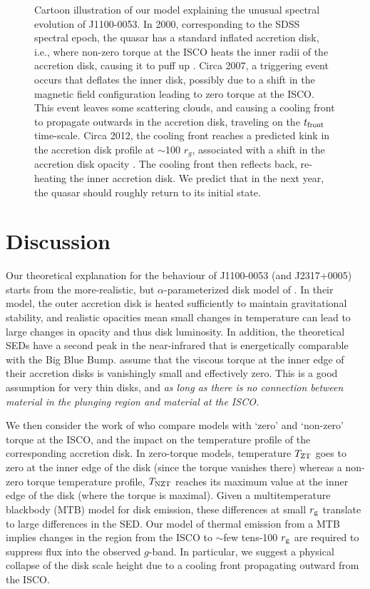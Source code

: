 \documentclass{nature}
\begin{document}
\begin{figure}
{    Cartoon illustration of our model explaining the unusual spectral evolution of J1100-0053. In 2000, corresponding to the SDSS spectral epoch, the quasar has a standard inflated accretion disk, i.e., where non-zero torque at the ISCO heats the inner radii of the accretion disk, causing it to puff up \citep[e.g.,][]{Zimmerman2005}. Circa 2007, a triggering event occurs that deflates the inner disk, possibly due to a shift in the magnetic field configuration leading to zero torque at the ISCO.  This event leaves some scattering clouds, and causing a cooling front to propagate outwards in the accretion disk, traveling on the $t_{\rm front}$ time-scale. Circa 2012, the cooling front reaches a predicted kink in the accretion disk profile at $\sim$100 $r_{g}$, associated with a shift in the accretion disk opacity \citep[e.g., Figure 2 of ][]{Sirko_Goodman2003}.  The cooling front then reflects back, re-heating the inner accretion disk. We predict that in the next year, the quasar should roughly return to its initial state.}
  \label{fig:J110057_diskmodel}
\end{figure}

\section{Discussion} 
Our theoretical explanation for the behaviour of J1100-0053 (and
J2317+0005) starts from the more-realistic, but $\alpha$-parameterized
disk model of \cite{Sirko_Goodman2003}. In their model, 
the outer accretion disk is heated sufficiently to
maintain gravitational stability, and realistic opacities mean small
changes in temperature can lead to large changes in opacity and thus disk luminosity. 
In addition, the theoretical SEDs have a second peak
in the near-infrared that is energetically comparable with the Big
Blue Bump. 
\cite{Sirko_Goodman2003} assume
that the viscous torque at the inner edge of their accretion
disks is vanishingly small and effectively zero. This is a good
assumption for very thin disks, and
\emph{as long as there is no connection between material in the plunging
region and material at the ISCO.}

We then consider the work of
\cite{Zimmerman2005} who compare models with `zero' and `non-zero'
torque at the ISCO,
and the impact on the temperature profile of the corresponding accretion disk.
In zero-torque models, temperature $T_{\rm ZT}$ goes to zero at
the inner edge of the disk (since the torque vanishes there) whereas
a non-zero torque temperature profile, $T_{\rm NZT}$ reaches its
maximum value at the inner edge of the disk (where the torque is maximal).
Given a multitemperature blackbody (MTB) model for disk emission,
these differences
at small $r_{\rm g}$ translate to large differences in the SED. 
Our model of thermal emission from a MTB implies changes in the
region from the ISCO to $\sim$few tens-100 $r_{\rm g}$ are required to
suppress flux into the observed $g$-band. In particular, we suggest a
physical collapse of the disk scale height due to a cooling front
propagating outward from the ISCO.
\end{document}

